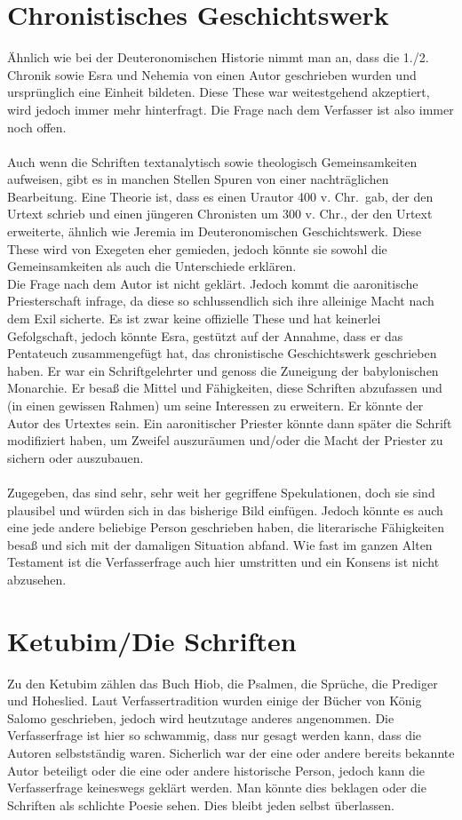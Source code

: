 \section{Chronistisches Geschichtswerk}
Ähnlich wie bei der Deuteronomischen Historie nimmt man an, dass die 1./2. Chronik sowie Esra und Nehemia von einen Autor geschrieben wurden und ursprünglich eine Einheit bildeten. Diese These war weitestgehend akzeptiert, wird jedoch immer mehr hinterfragt. Die Frage nach dem Verfasser ist also immer noch offen.
\\~\\
Auch wenn die Schriften textanalytisch sowie theologisch Gemeinsamkeiten aufweisen, gibt es in manchen Stellen Spuren von einer nachträglichen Bearbeitung. Eine Theorie ist, dass es einen Urautor 400 v. Chr.\ gab, der den Urtext schrieb und einen jüngeren Chronisten um 300 v. Chr., der den Urtext erweiterte, ähnlich wie Jeremia im Deuteronomischen Geschichtswerk. Diese These wird von Exegeten eher gemieden, jedoch könnte sie sowohl die Gemeinsamkeiten als auch die Unterschiede erklären.
\\
Die Frage nach dem Autor ist nicht geklärt. Jedoch kommt die aaronitische Priesterschaft infrage, da diese so schlussendlich sich ihre alleinige Macht nach dem Exil sicherte. Es ist zwar keine offizielle These und hat keinerlei Gefolgschaft, jedoch könnte Esra, gestützt auf der Annahme, dass er das Pentateuch zusammengefügt hat, das chronistische Geschichtswerk geschrieben haben. Er war ein Schriftgelehrter und genoss die Zuneigung der babylonischen Monarchie. Er besaß die Mittel und Fähigkeiten, diese Schriften abzufassen und (in einen gewissen Rahmen) um seine Interessen zu erweitern. Er könnte der Autor des Urtextes sein. Ein aaronitischer Priester könnte dann später die Schrift modifiziert haben, um Zweifel auszuräumen und/oder die Macht der Priester zu sichern oder auszubauen.
\\~\\
Zugegeben, das sind sehr, sehr weit her gegriffene Spekulationen, doch sie sind plausibel und würden sich in das bisherige Bild einfügen. Jedoch könnte es auch eine jede andere beliebige Person geschrieben haben, die literarische Fähigkeiten besaß und sich mit der damaligen Situation abfand. Wie fast im ganzen Alten Testament ist die Verfasserfrage auch hier umstritten und ein Konsens ist nicht abzusehen.

\section{Ketubim/Die Schriften}
Zu den Ketubim zählen das Buch Hiob, die Psalmen, die Sprüche, die Prediger und Hoheslied. Laut Verfassertradition wurden einige der Bücher von König Salomo geschrieben, jedoch wird heutzutage anderes angenommen. Die Verfasserfrage ist hier so schwammig, dass nur gesagt werden kann, dass die Autoren selbstständig waren. Sicherlich war der eine oder andere bereits bekannte Autor beteiligt oder die eine oder andere historische Person, jedoch kann die Verfasserfrage keineswegs geklärt werden. Man könnte dies beklagen oder die Schriften als schlichte Poesie sehen. Dies bleibt jeden selbst überlassen.

